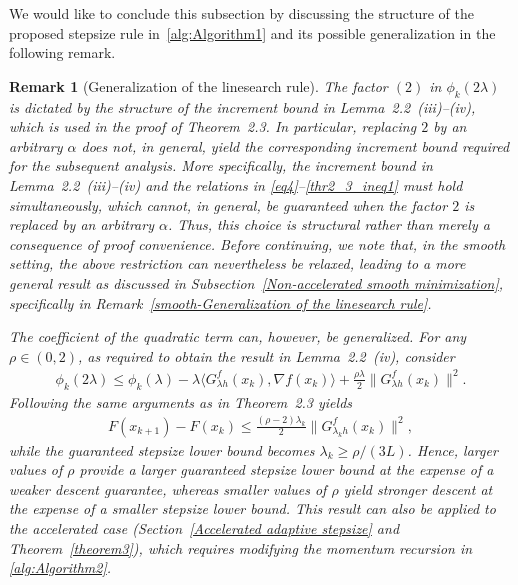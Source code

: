 \documentclass[11pt, a4paper, oneside, reqno]{amsart}
\newtheorem{remark}[theorem]{Remark}
\begin{document}
{\color{black} We would like to conclude this subsection by discussing the structure of the proposed stepsize rule in~\ref{alg:Algorithm1} and its possible generalization in the following remark.
\begin{remark}[Generalization of the linesearch rule]\label{Generalization of the linesearch rule}
The factor $(2)$ in $\phi_k(2\lambda)$ is dictated by the structure of the increment bound in Lemma~2.2~(iii)--(iv), which is used in the proof of Theorem~2.3. In particular, replacing $2$ by an arbitrary $\alpha$ does not, in general, yield the corresponding increment bound required for the subsequent analysis. More specifically, the increment bound in Lemma~2.2~(iii)--(iv) and the relations in \eqref{eq4}--\eqref{thr2_3_ineq1} must hold simultaneously, which cannot, in general, be guaranteed when the factor $2$ is replaced by an arbitrary $\alpha$. Thus, this choice is structural rather than merely a consequence of proof convenience. Before continuing, we note that, in the smooth setting, the above restriction can nevertheless be relaxed, leading to a more general result as discussed in Subsection~\ref{Non-accelerated smooth minimization}, specifically in Remark~\ref{smooth-Generalization of the linesearch rule}.

The coefficient of the quadratic term can, however, be generalized. For any $\rho\in(0,2)$, as required to obtain the result in Lemma~2.2~(iv), consider
\begin{align*}%
\phi_k(2\lambda)
\leq
\phi_k(\lambda)
-\lambda
\langle
G^f_{\lambda h}(x_k),\nabla f(x_k)
\rangle
+\frac{\rho\lambda}{2}
\|G^f_{\lambda h}(x_k)\|^2.
\end{align*}
Following the same arguments as in Theorem~2.3 yields
\begin{align*}
F(x_{k+1})-F(x_k)
\leq
\frac{(\rho-2)\lambda_k}{2}
\|G^f_{\lambda_k h}(x_k)\|^2,
\end{align*}
while the guaranteed stepsize lower bound becomes $\lambda_k\geq \rho/(3L)$. Hence, larger values of $\rho$ provide a larger guaranteed stepsize lower bound at the expense of a weaker descent guarantee, whereas smaller values of $\rho$ yield stronger descent at the expense of a smaller stepsize lower bound. This result can also be applied to the accelerated case (Section~\ref{Accelerated adaptive stepsize} and Theorem~\ref{theorem3}), which requires modifying the momentum recursion in \ref{alg:Algorithm2}.%
\end{remark}
}
\end{document}
